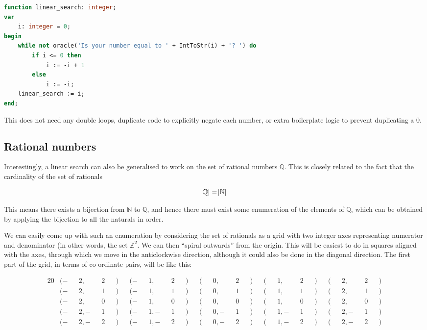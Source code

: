 \documentclass{article}
\begin{document}
\begin{lstlisting}[language=Pascal, caption=Linear search on $\mathbb{Z}$ implementation]
function linear_search: integer;
var
    i: integer = 0;
begin
    while not oracle('Is your number equal to ' + IntToStr(i) + '? ') do
        if i <= 0 then
            i := -i + 1
        else
            i := -i;
    linear_search := i;
end;
\end{lstlisting}

    This does not need any double loops, duplicate code to explicitly negate
    each number, or extra boilerplate logic to prevent duplicating a 0.

    \subsection{Rational numbers}

    Interestingly, a linear search can also be generalised to work on the set
    of rational numbers $\mathbb{Q}$. This is closely related to the fact that
    the cardinality of the set of rationals

    \begin{equation}
    \abs{\mathbb{Q}} = \abs{\mathbb{N}}
    \end{equation}

    This means there exists a bijection from $\mathbb{N}$ to $\mathbb{Q}$, and
    hence there must exist some enumeration of the elements of $\mathbb{Q}$,
    which can be obtained by applying the bijection to all the naturals in
    order.
    
    We can easily come up with such an enumeration by considering the set of
    rationals as a grid with two integer axes representing numerator and
    denominator (in other words, the set $\mathbb{Z}^2$. We can then ``spiral
    outwards'' from the origin. This will be easiest to do in squares aligned
    with the axes, through which we move in the anticlockwise direction,
    although it could also be done in the diagonal direction.  The first part
    of the grid, in terms of co-ordinate pairs, will be like this:

    \begin{alignat*}{20}
    &(-&&2, &&2&&) &&(-&&1, &&2&&) &&(&&0, &&2&&) &&(&&1, &&2&&) &&(&&2, &&2&&)\\
    &(-&&2, &&1&&) &&(-&&1, &&1&&) &&(&&0, &&1&&) &&(&&1, &&1&&) &&(&&2, &&1&&)\\
    &(-&&2, &&0&&) &&(-&&1, &&0&&) &&(&&0, &&0&&) &&(&&1, &&0&&) &&(&&2, &&0&&)\\
    &(-&&2, -&&1&&) &&(-&&1, -&&1&&) &&(&&0, -&&1&&) &&(&&1, -&&1&&) &&(&&2, -&&1&&)\\
    &(-&&2, -&&2&&) &&(-&&1, -&&2&&) &&(&&0, -&&2&&) &&(&&1, -&&2&&) &&(&&2, -&&2&&)\\
    \end{alignat*}
\end{document}
